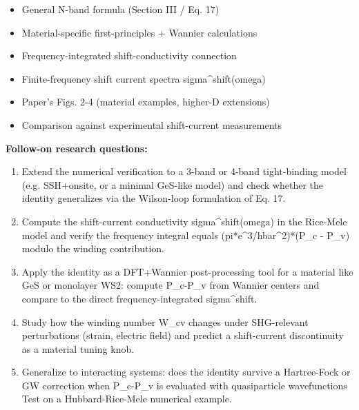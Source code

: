 \documentclass[11pt]{article}
\begin{document}
\begin{itemize}[leftmargin=1.4em,itemsep=0.2em,topsep=0.2em]
\item General N-band formula (Section III / Eq. 17)
\item Material-specific first-principles + Wannier calculations
\item Frequency-integrated shift-conductivity connection
\item Finite-frequency shift current spectra sigma\textasciicircum{}shift(omega)
\item Paper's Figs. 2-4 (material examples, higher-D extensions)
\item Comparison against experimental shift-current measurements
\end{itemize}\noindent\textbf{Follow-on research questions:}
\begin{enumerate}[leftmargin=1.6em,itemsep=0.2em,topsep=0.2em,label=Q\arabic*.]
\item Extend the numerical verification to a 3-band or 4-band tight-binding model (e.g. SSH+onsite, or a minimal GeS-like model) and check whether the identity generalizes via the Wilson-loop formulation of Eq. 17.
\item Compute the shift-current conductivity sigma\textasciicircum{}shift(omega) in the Rice-Mele model and verify the frequency integral equals (pi*e\textasciicircum{}3/hbar\textasciicircum{}2)*(P\_c - P\_v) modulo the winding contribution.
\item Apply the identity as a DFT+Wannier post-processing tool for a material like GeS or monolayer WS2: compute P\_c-P\_v from Wannier centers and compare to the direct frequency-integrated sigma\textasciicircum{}shift.
\item Study how the winding number W\_cv changes under SHG-relevant perturbations (strain, electric field) and predict a shift-current discontinuity as a material tuning knob.
\item Generalize to interacting systems: does the identity survive a Hartree-Fock or GW correction when P\_c-P\_v is evaluated with quasiparticle wavefunctions Test on a Hubbard-Rice-Mele numerical example.
\end{enumerate}
\end{document}
